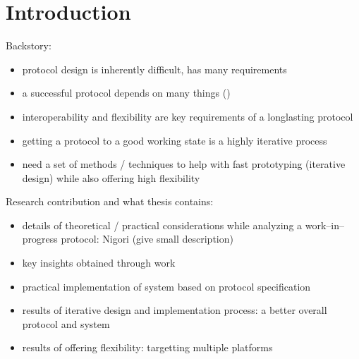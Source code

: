 \chapter{Introduction}
\setcounter{page}{1}

Backstory:
\begin{itemize}
  \item protocol design is inherently difficult, has many requirements \cite{ProtocolDesign}
  \item a successful protocol depends on many things (\cite{RFC5218})
  \item interoperability and flexibility are key requirements of a longlasting protocol
  \item getting a protocol to a good working state is a highly iterative process
  \item need a set of methods / techniques to help with fast prototyping (iterative design) while also offering high flexibility
\end{itemize}

Research contribution and what thesis contains:
\begin{itemize}
  \item details of theoretical / practical considerations while analyzing a work--in--progress protocol: Nigori (give small description)
  \item key insights obtained through work
  \item practical implementation of system based on protocol specification
  \item results of iterative design and implementation process: a better overall protocol and system
  \item results of offering flexibility: targetting multiple platforms
\end{itemize}
